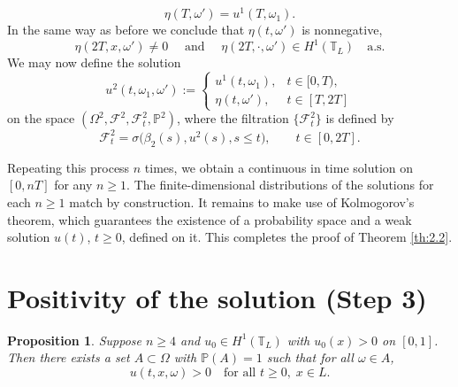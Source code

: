 \documentclass[a4paper,12pt]{article}
\newtheorem{proposition}[definition]{Proposition}
\numberwithin{equation}{section}
\def\T{\mathbb{T}_L}
\begin{document}
\[
\eta(T,\omega') = u^{1}(T,\omega_1).
\]
In the same way as before we conclude that $\eta(t,\omega')$ is nonnegative,
\[
\eta(2T, x, \omega') \neq 0 \quad \text{ and } \quad \eta(2T,\cdot, \omega') \in H^{1}(\T) \quad \text{a.s.}
\]
We may now define the solution
\[
u^{2}(t,\omega_1,\omega') :=
\begin{cases}
u^{1}(t,\omega_1), & t \in [0,T), \\[4pt]
\eta(t,\omega'), & t \in [T,2T]
\end{cases}
\]
on the space $(\Omega^{2}, \mathcal{F}^{2}, \mathcal{F}^{2}_{t}, \mathbb{P}^{2})$, 
where the filtration $\{\mathcal{F}^{2}_{t}\}$ is defined by
\[
\mathcal{F}^{2}_{t} = \sigma\big( \beta_{2}(s), u^{2}(s), s \le t \big),
\qquad t \in [0,2T].
\]

Repeating this process $n$ times, we obtain a continuous in time solution
on $[0,nT]$ for any $n \ge 1$. The finite-dimensional distributions of the solutions for each $n \ge 1$ match by construction. It remains to make use of Kolmogorov's theorem, which guarantees
the existence of a probability space and a weak solution $u(t)$, $t \ge 0$,
defined on it. This completes the proof of Theorem \ref{th:2.2}.

\bigskip

\section{Positivity of the solution (Step 3)}\label{Sec 5}

\begin{proposition}\label{prop:5.1}
Suppose $n \ge 4$ and $u_0 \in H^{1}(\mathbb{T}_L)$ with
$u_0(x) > 0$ on $[0,1]$. Then there exists a set
$A \subset \Omega$ with $\mathbb{P}(A)=1$ such that
for all $\omega \in A$,
\[
u(t,x,\omega) > 0
\quad \text{for all } t \ge 0, \; x \in L.
\]
\end{proposition}
\end{document}
